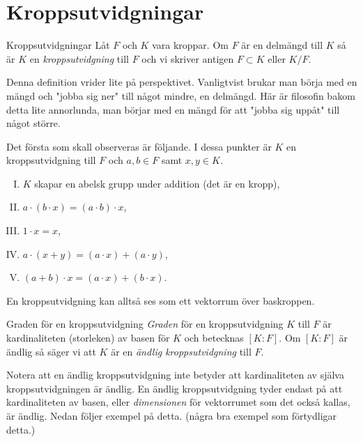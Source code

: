 \documentclass{article}
\theoremstyle{definition}
\begin{document}
\section{Kroppsutvidgningar}
\begin{mydef}{Kroppsutvidgningar}{}
  Låt $F$ och $K$ vara kroppar. Om $F$ är en delmängd till $K$ så är $K$ en \textit{kroppsutvidgning} till $F$ och vi skriver antigen $F \subset K$ eller $K/F$.
\end{mydef}
Denna definition vrider lite på perspektivet. Vanligtvist brukar man börja med en mängd och "jobba sig ner" till något mindre, en delmängd. Här är filosofin bakom detta lite 
annorlunda, man börjar med en mängd för att "jobba sig uppåt" till något större. 

Det första som skall observeras är följande. I dessa punkter är $K$ en kroppsutvidgning till $F$ och $a, b \in F$ samt $x, y \in K$.

\begin{enumerate}[I)]
  \item $K$ skapar en abelsk grupp under addition (det är en kropp),
  \item $a \cdot (b \cdot x) = (a \cdot b) \cdot x$,
  \item $1 \cdot x = x$,
  \item $a \cdot (x + y) = (a \cdot x) + (a \cdot y)$,
  \item $(a + b) \cdot x = (a \cdot x) + (b \cdot x)$.
\end{enumerate}
En kroppsutvidgning kan alltså ses som ett vektorrum över baskroppen. 

\begin{mydef}{Graden för en kroppsutvidgning}{}
  \textit{Graden} för en kroppsutvidgning $K$ till $F$ är kardinaliteten (storleken) av basen för $K$ och betecknas $[K:F]$. Om $[K:F]$ är ändlig så 
  säger vi att $K$ är en \textit{ändlig kroppsutvidgning} till $F$. 
\end{mydef}
Notera att en ändlig kroppsutvidgning inte betyder att kardinaliteten av själva kroppsutvidgningen är ändlig. En ändlig kroppsutvidgning
tyder endast på att kardinaliteten av basen, eller \textit{dimensionen} för vektorrumet som det också kallas, är ändlig. Nedan följer exempel på detta.
(några bra exempel som förtydligar detta.) 
\end{document}
